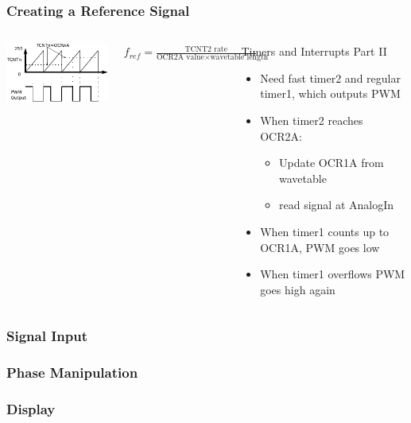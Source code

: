 \documentclass{beamer}
\begin{document}
\begin{frame}
\frametitle{Creating a Reference Signal}
\begin{columns}[T]
	\vspace{.5cm}
	    \includegraphics[scale=1.2]{Bitbang}
	    \vspace{1cm}
	    \begin{exampleblock}
	    $f_{ref}=\frac{\text{TCNT2 rate}}{\text{OCR2A value}\times\text{wavetable length}}$
	    \end{exampleblock}

	\begin{exampleblock}{Timers and Interrupts Part II}
	\begin{itemize}
	\item {Need fast timer2 and regular timer1, which outputs PWM}
	\item{When timer2 reaches OCR2A:}
	\begin{itemize}
        \item {Update OCR1A from wavetable}
        \item{ read signal at AnalogIn}
	\end{itemize}
	\item{When timer1 counts up to OCR1A, PWM goes low}
	\item {When timer1 overflows PWM goes high again}
	
	\end{itemize}
	
	\end{exampleblock}
\end{columns}
\end{frame}

\begin{frame}
\frametitle{Signal Input}

\end{frame}
\begin{frame}
\frametitle{Phase Manipulation}

\end{frame}

\begin{frame}
\frametitle{Display}
\end{frame}
\end{document}
